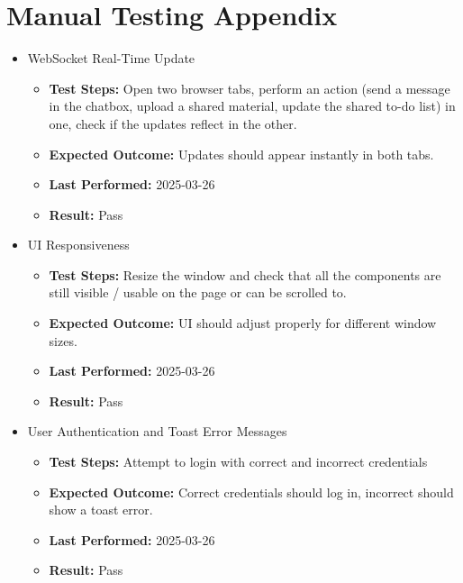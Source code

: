 \section{Manual Testing Appendix}
\label{sect:manual:testing}
\begin{itemize}
    \item WebSocket Real-Time Update
    \begin{itemize}
        \item \textbf{Test Steps:} Open two browser tabs, perform an action (send a message in the chatbox, upload a shared material, update the shared to-do list) in one, check if the updates reflect in the other.
        \item \textbf{Expected Outcome:} Updates should appear instantly in both tabs.
        \item \textbf{Last Performed:} 2025-03-26
        \item \textbf{Result:} Pass
    \end{itemize}

    \item UI Responsiveness
    \begin{itemize}
        \item \textbf{Test Steps:} Resize the window and check that all the components are still visible / usable on the page or can be scrolled to.
        \item \textbf{Expected Outcome:} UI should adjust properly for different window sizes.
        \item \textbf{Last Performed:} 2025-03-26
        \item \textbf{Result:} Pass
    \end{itemize}

    \item User Authentication and Toast Error Messages
    \begin{itemize}
        \item \textbf{Test Steps:} Attempt to login with correct and incorrect credentials
        \item \textbf{Expected Outcome:} Correct credentials should log in, incorrect should show a toast error.
        \item \textbf{Last Performed:} 2025-03-26
        \item \textbf{Result:} Pass
    \end{itemize}
\end{itemize}

